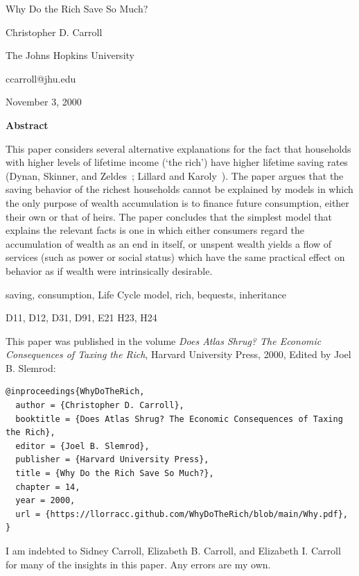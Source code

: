 \documentclass[titlepage,12pt]{article}
\begin{document}
      

\begin{titlepage}

{\centerline {\LARGE Why Do the Rich Save So Much?}}
\vspace{0.5in}


\centerline{Christopher D. Carroll}
\centerline{The Johns Hopkins University}
\centerline{ccarroll@jhu.edu}

\medskip\medskip


\centerline{November 3, 2000}


\vspace{0.1in}

\centerline{\bf Abstract}

This paper considers several alternative explanations for the fact 
that households with higher levels of lifetime income (`the rich') 
have higher lifetime saving rates (Dynan, Skinner, and 
Zeldes~\cite{dsz:richsave}; Lillard and 
Karoly~\cite{lillard&karoly:richsave}).  The paper argues that the 
saving behavior of the richest households cannot be explained by 
models in which the only purpose of wealth accumulation is to finance 
future consumption, either their own or that of heirs.  The paper 
concludes that the simplest model that explains the relevant facts is 
one in which either consumers regard the accumulation of wealth as an 
end in itself, or unspent wealth yields a flow of services (such as 
power or social status) which have the same practical effect on 
behavior as if wealth were intrinsically desirable.

\vspace{.2in}
 saving, consumption, Life Cycle model, rich, 
bequests, inheritance

\medskip
{} D11, D12, D31, D91, E21 H23, H24 

\medskip \medskip This paper was published in the volume {\it Does Atlas Shrug?
The Economic Consequences of Taxing the Rich}, Harvard University Press, 
2000, Edited by Joel B. Slemrod:

\begin{tiny}
\begin{verbatim}
@inproceedings{WhyDoTheRich,
  author = {Christopher D. Carroll},
  booktitle = {Does Atlas Shrug? The Economic Consequences of Taxing the Rich},
  editor = {Joel B. Slemrod},
  publisher = {Harvard University Press},
  title = {Why Do the Rich Save So Much?},
  chapter = 14,
  year = 2000,
  url = {https://llorracc.github.com/WhyDoTheRich/blob/main/Why.pdf},
}
\end{verbatim}
\end{tiny}

{\small I am indebted to Sidney Carroll, Elizabeth B. 
Carroll, and Elizabeth I. Carroll for many of the insights in this 
paper.  Any errors are my own.}

\end{titlepage}
\end{document}
